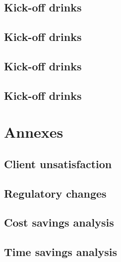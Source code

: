 \documentclass[8pt]{article} %
\begin{document}
\subsection{Kick-off drinks}
\subsection{Kick-off drinks}
\subsection{Kick-off drinks}
\subsection{Kick-off drinks}

\section{Annexes}
\subsection{Client unsatisfaction}
\subsection{Regulatory changes}
\subsection{Cost savings analysis}
\subsection{Time savings analysis}
\end{document}
